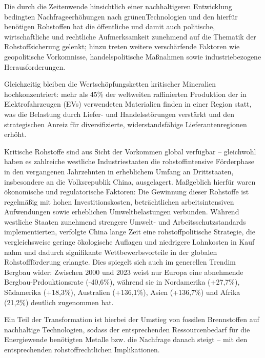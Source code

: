 \documentclass[12pt,a4paper,oneside]{book} %
\begin{document}
	Die durch die Zeitenwende hinsichtlich einer nachhaltigeren Entwicklung bedingten Nachfrageerhöhungen nach \glqq grünen\grqq Technologien und den hierfür benötigen Rohstoffen hat die öffentliche und damit auch politische, wirtschaftliche und rechtliche Aufmerksamkeit zunehmend auf die Thematik der Rohstoffsicherung gelenkt; hinzu treten weitere verschärfende Faktoren wie geopolitische Vorkomnisse, handelspolitische Maßnahmen sowie industriebezogene Herausforderungen. 
	
	Gleichzeitig bleiben die Wertschöpfungsketten kritischer Mineralien hochkonzentriert: mehr als 45\% der weltweiten raffinierten Produktion der in Elektrofahrzeugen (EVs) verwendeten Materialien finden in einer Region statt, was die Belastung durch Liefer- und Handelsstörungen verstärkt und den strategischen Anreiz für diversifizierte, widerstandsfähige Lieferantenregionen erhöht.
	
	Kritische Rohstoffe sind aus Sicht der Vorkommen global verfügbar -- gleichwohl haben es zahlreiche westliche Industriestaaten die rohstoffintensive Förderphase in den vergangenen Jahrzehnten in erheblichem Umfang an Drittstaaten, insbesondere an die Volksrepublik China, ausgelagert. Maßgeblich hierfür waren ökonomische und regulatorische Faktoren: Die Gewinnung dieser Rohstoffe ist regelmäßig mit hohen Investitionskosten, beträchtlichen arbeitsintensiven Aufwendungen sowie erheblichen Umweltbelastungen verbunden. Während westliche Staaten zunehmend strengere Umwelt- und Arbeitsschutzstandards implementierten, verfolgte China lange Zeit eine rohstoffpolitische Strategie, die vergleichsweise geringe ökologische Auflagen und niedrigere Lohnkosten in Kauf nahm und dadurch signifikante Wettbewerbsvorteile in der globalen Rohstoffförderung erlangte.
	Dies spiegelt sich auch im generellen Trendim Bergbau wider: Zwischen 2000 und 2023 weist nur Europa eine abnehmende Bergbau-Prdouktionsrate (-40,6\%), während sie in Nordamerika (+27,7\%), Südamerika (+18,3\%), Australien (+136,1\%), Asien (+136,7\%) und Afrika (21,2\%) deutlich zugenommen hat.\autocite{World Mining Data 2025, BMW Österreich}
	
	Ein Teil der Transformation ist hierbei der Umstieg von fossilen Brennstoffen auf nachhaltige Technologien, sodass der entsprechenden Ressourcenbedarf für die Energiewende benötigten Metalle bzw. die Nachfrage danach steigt\autocite{Driving factors for responsible sourcing in Europe: Motivations of renewable energy technology manufacturers} -- mit den entsprechenden rohstoffrechtlichen Implikationen.
	
\end{document}
